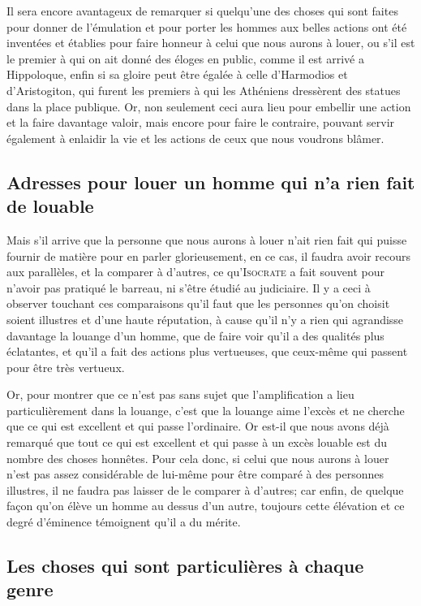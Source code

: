 \bigbreak

Il sera encore avantageux de remarquer si quelqu'une des choses qui sont faites pour donner de l'émulation et pour
porter les hommes aux belles actions ont été inventées et établies pour faire honneur à celui que nous aurons à louer,
ou s'il est le premier à qui on ait donné des éloges en public, comme il est arrivé a Hippoloque, enfin si sa gloire
peut être égalée à celle d'Harmodios et d'Aristogiton, qui furent les premiers à qui les Athéniens dressèrent des
statues dans la place publique. Or, non seulement ceci aura lieu pour embellir une action et la faire davantage valoir,
mais encore pour faire le contraire, pouvant servir également à enlaidir la vie et les actions de ceux que nous
voudrons blâmer. 

\subsection{Adresses pour louer un homme qui n'a rien fait de louable}

Mais s'il arrive que la personne que nous aurons à louer n'ait rien fait qui puisse fournir de matière pour en parler
glorieusement, en ce cas, il faudra avoir recours aux parallèles, et la comparer à d'autres, ce qu'\textsc{Isocrate} a
fait souvent pour n'avoir pas pratiqué le barreau, ni s'être étudié au judiciaire. Il y a ceci à observer touchant ces
comparaisons qu'il faut que les personnes qu'on choisit soient illustres et d'une haute réputation, à cause qu'il n'y
a rien qui agrandisse davantage la louange d'un homme, que de faire voir qu'il a des qualités plus éclatantes, et qu'il
a fait des actions plus vertueuses, que ceux-même qui passent pour être très vertueux.

Or, pour montrer que ce n'est pas sans sujet que l'amplification a lieu particulièrement dans la louange, c'est que la
louange aime l’excès et ne cherche que ce qui est excellent et qui passe l'ordinaire. Or est-il que nous avons déjà
remarqué que tout ce qui est excellent et qui passe à un excès louable est du nombre des choses honnêtes. Pour cela
donc, si celui que nous aurons à louer n'est pas assez considérable de lui-même pour être comparé à des personnes
illustres, il ne faudra pas laisser de le comparer à d'autres; car enfin, de quelque façon qu'on élève un homme au
dessus d'un autre, toujours cette élévation et ce degré d'éminence témoignent qu'il a du mérite.

\subsection{Les choses qui sont particulières à chaque genre}

